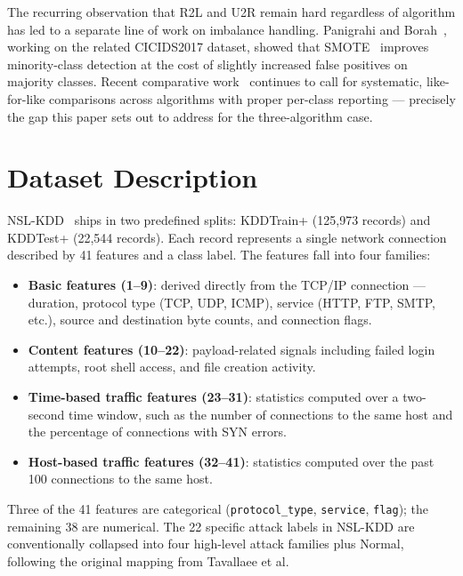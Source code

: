 \documentclass[conference, twocolumn]{IEEEtran}
\begin{document}
The recurring observation that R2L and U2R remain hard regardless of algorithm has led to a separate line of work on imbalance handling. Panigrahi and Borah~\cite{panigrahi2018}, working on the related CICIDS2017 dataset, showed that SMOTE~\cite{chawla2002} improves minority-class detection at the cost of slightly increased false positives on majority classes. Recent comparative work~\cite{nature2026, applied2025} continues to call for systematic, like-for-like comparisons across algorithms with proper per-class reporting --- precisely the gap this paper sets out to address for the three-algorithm case.

\section{Dataset Description}

NSL-KDD~\cite{tavallaee2009} ships in two predefined splits: KDDTrain+ (125{,}973 records) and KDDTest+ (22{,}544 records). Each record represents a single network connection described by 41 features and a class label. The features fall into four families:

\begin{itemize}
    \item \textbf{Basic features (1--9)}: derived directly from the TCP/IP connection --- duration, protocol type (TCP, UDP, ICMP), service (HTTP, FTP, SMTP, etc.), source and destination byte counts, and connection flags.
    \item \textbf{Content features (10--22)}: payload-related signals including failed login attempts, root shell access, and file creation activity.
    \item \textbf{Time-based traffic features (23--31)}: statistics computed over a two-second time window, such as the number of connections to the same host and the percentage of connections with SYN errors.
    \item \textbf{Host-based traffic features (32--41)}: statistics computed over the past 100 connections to the same host.
\end{itemize}

Three of the 41 features are categorical (\texttt{protocol\_type}, \texttt{service}, \texttt{flag}); the remaining 38 are numerical. The 22 specific attack labels in NSL-KDD are conventionally collapsed into four high-level attack families plus Normal, following the original mapping from Tavallaee et al.
\end{document}

